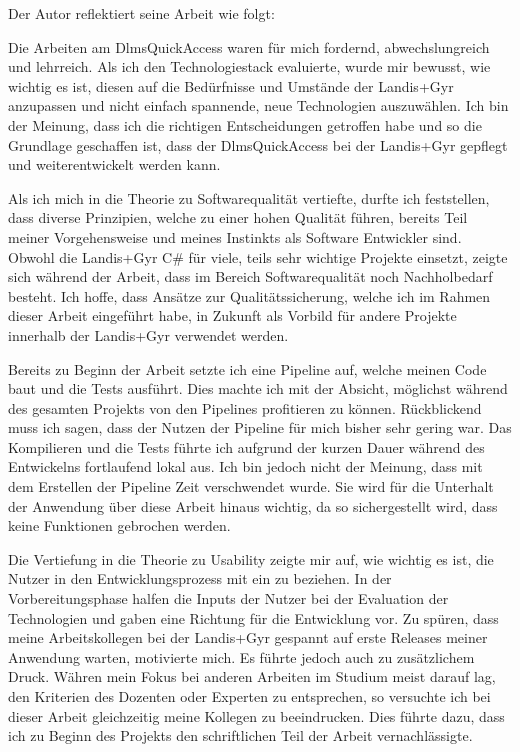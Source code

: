 Der Autor reflektiert seine Arbeit wie folgt:

\dq
Die Arbeiten am DlmsQuickAccess waren für mich fordernd, abwechslungreich und lehrreich.
Als ich den Technologiestack evaluierte, wurde mir bewusst, wie wichtig es ist, diesen auf die Bedürfnisse und Umstände der Landis+Gyr anzupassen und nicht einfach spannende, neue Technologien auszuwählen.
Ich bin der Meinung, dass ich die richtigen Entscheidungen getroffen habe und so die Grundlage geschaffen ist, dass der DlmsQuickAccess bei der Landis+Gyr gepflegt und weiterentwickelt werden kann.

Als ich mich in die Theorie zu Softwarequalität vertiefte, durfte ich feststellen, dass diverse Prinzipien, welche zu einer hohen Qualität führen, bereits Teil meiner Vorgehensweise und meines Instinkts als Software Entwickler sind.
Obwohl die Landis+Gyr C\# für viele, teils sehr wichtige Projekte einsetzt, zeigte sich während der Arbeit, dass im Bereich Softwarequalität noch Nachholbedarf besteht.
Ich hoffe, dass Ansätze zur Qualitätssicherung, welche ich im Rahmen dieser Arbeit eingeführt habe, in Zukunft als Vorbild für andere Projekte innerhalb der Landis+Gyr verwendet werden.

Bereits zu Beginn der Arbeit setzte ich eine Pipeline auf, welche meinen Code baut und die Tests ausführt.
Dies machte ich mit der Absicht, möglichst während des gesamten Projekts von den Pipelines profitieren zu können.
Rückblickend muss ich sagen, dass der Nutzen der Pipeline für mich bisher sehr gering war.
Das Kompilieren und die Tests führte ich aufgrund der kurzen Dauer während des Entwickelns fortlaufend lokal aus.
Ich bin jedoch nicht der Meinung, dass mit dem Erstellen der Pipeline Zeit verschwendet wurde.
Sie wird für die Unterhalt der Anwendung über diese Arbeit hinaus wichtig, da so sichergestellt wird, dass keine Funktionen gebrochen werden.

Die Vertiefung in die Theorie zu Usability zeigte mir auf, wie wichtig es ist, die Nutzer in den Entwicklungsprozess mit ein zu beziehen.
In der Vorbereitungsphase halfen die Inputs der Nutzer bei der Evaluation der Technologien und gaben eine Richtung für die Entwicklung vor.
Zu spüren, dass meine Arbeitskollegen bei der Landis+Gyr gespannt auf erste Releases meiner Anwendung warten, motivierte mich.
Es führte jedoch auch zu zusätzlichem Druck.
Währen mein Fokus bei anderen Arbeiten im Studium meist darauf lag, den Kriterien des Dozenten oder Experten zu entsprechen, so versuchte ich bei dieser Arbeit gleichzeitig meine Kollegen zu beeindrucken.
Dies führte dazu, dass ich zu Beginn des Projekts den schriftlichen Teil der Arbeit vernachlässigte.

